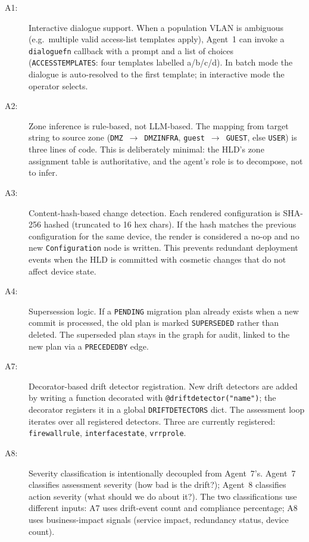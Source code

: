 \documentclass[acmtog]{acmart}
\renewcommand\_{\textunderscore\allowbreak}
\begin{document}
\begin{description}
  \item[A1:] Interactive dialogue support. When a population VLAN
    is ambiguous (e.g.\ multiple valid access-list templates apply),
    Agent~1 can invoke a \texttt{dialogue\_fn} callback with a
    prompt and a list of choices (\texttt{\_ACCESS\_TEMPLATES}: four
    templates labelled a/b/c/d). In batch mode the dialogue is
    auto-resolved to the first template; in interactive mode the
    operator selects.

  \item[A2:] Zone inference is rule-based, not LLM-based. The
    mapping from target string to source zone
    (\texttt{DMZ}~$\rightarrow$~\texttt{DMZ\_INFRA},
    \texttt{guest}~$\rightarrow$~\texttt{GUEST}, else
    \texttt{USER}) is three lines of code. This is deliberately
    minimal: the HLD's zone assignment table is authoritative, and
    the agent's role is to decompose, not to infer.

  \item[A3:] Content-hash-based change detection. Each rendered
    configuration is SHA-256 hashed (truncated to 16 hex chars).
    If the hash matches the previous configuration for the same
    device, the render is considered a no-op and no new
    \texttt{Configuration} node is written. This prevents redundant
    deployment events when the HLD is committed with cosmetic
    changes that do not affect device state.

  \item[A4:] Supersession logic. If a \texttt{PENDING} migration
    plan already exists when a new commit is processed, the old
    plan is marked \texttt{SUPERSEDED} rather than deleted. The
    superseded plan stays in the graph for audit, linked to the
    new plan via a \texttt{PRECEDED\_BY} edge.

  \item[A7:] Decorator-based drift detector registration. New
    drift detectors are added by writing a function decorated with
    \texttt{@\_drift\_detector("name")}; the decorator registers it
    in a global \texttt{\_DRIFT\_DETECTORS} dict. The assessment
    loop iterates over all registered detectors. Three are currently
    registered: \texttt{firewall\_rule}, \texttt{interface\_state},
    \texttt{vrrp\_role}.

  \item[A8:] Severity classification is intentionally decoupled
    from Agent~7's. Agent~7 classifies assessment severity (how bad
    is the drift?); Agent~8 classifies action severity (what should
    we do about it?). The two classifications use different inputs:
    A7 uses drift-event count and compliance percentage; A8 uses
    business-impact signals (service impact, redundancy status,
    device count).
\end{description}
\end{document}

